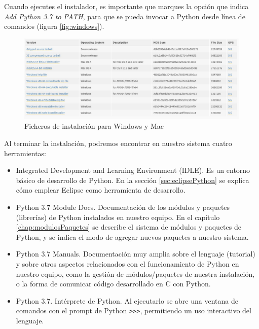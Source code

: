 Cuando ejecutes el instalador, es importante que marques la opción que indica \emph{Add Python 3.7 to PATH}, para que se pueda invocar a Python desde línea de comandos (figura \ref{fig:windows}).

\begin{figure}
\begin{center}
\includegraphics[height=0.38\textwidth]{imagenes/ficheros_inst_windows_mac}
\end{center}
\caption{Ficheros de instalación para Windows y Mac}
\label{fig:instalacion}
\end{figure}

Al terminar la instalación, podremos encontrar en nuestro sistema cuatro herramientas:
\begin{itemize}
	\item Integrated Development and Learning Environment (IDLE). Es un entorno básico de desarrollo de Python. En la sección \ref{sec:eclipsePython} se explica cómo emplear Eclipse como herramienta de desarrollo.
	\item Python 3.7 Module Docs. Documentación de los módulos y paquetes (librerías) de Python instalados en nuestro equipo. En el capítulo \ref{chap:modulosPaquetes} se describe el sistema de módulos y paquetes de Python, y se indica el modo de agregar nuevos paquetes a nuestro sistema.
	\item Python 3.7 Manuals. Documentación muy amplia sobre el lenguaje (tutorial) y sobre otros aspectos relacionados con el funcionamiento de Python en nuestro equipo, como la gestión de módulos/paquetes de nuestra instalación, o la forma de comunicar código desarrollado en C con Python.
	\item Python 3.7. Intérprete de Python. Al ejecutarlo se abre una ventana de comandos con el prompt de Python \texttt{>{}>{}>}, permitiendo un uso interactivo del lenguaje.
\end{itemize}

